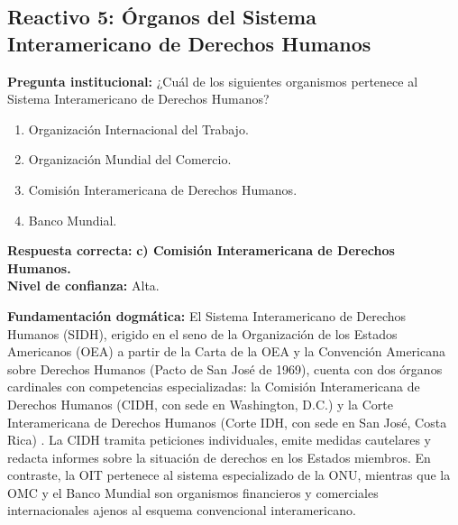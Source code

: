 \documentclass[12pt,spanish,letterpaper,oneside]{article}
\begin{document}
\subsection{Reactivo 5: \'Organos del Sistema Interamericano de Derechos Humanos}
\textbf{Pregunta institucional:} ¿Cu\'al de los siguientes organismos pertenece al Sistema Interamericano de Derechos Humanos?
\begin{enumerate}
\item[a)] Organizaci\'on Internacional del Trabajo.
\item[b)] Organizaci\'on Mundial del Comercio.
\item[c)] Comisi\'on Interamericana de Derechos Humanos.
\item[d)] Banco Mundial.
\end{enumerate}

\textbf{Respuesta correcta:} \textbf{c) Comisi\'on Interamericana de Derechos Humanos.} \\
\textbf{Nivel de confianza:} Alta.

\textbf{Fundamentaci\'on dogm\'atica:} El Sistema Interamericano de Derechos Humanos (SIDH), erigido en el seno de la Organizaci\'on de los Estados Americanos (OEA) a partir de la Carta de la OEA y la Convenci\'on Americana sobre Derechos Humanos (Pacto de San Jos\'e de 1969), cuenta con dos \'organos cardinales con competencias especializadas: la Comisi\'on Interamericana de Derechos Humanos (CIDH, con sede en Washington, D.C.) y la Corte Interamericana de Derechos Humanos (Corte IDH, con sede en San Jos\'e, Costa Rica) \citep{oeaPacto1969ADH}. La CIDH tramita peticiones individuales, emite medidas cautelares y redacta informes sobre la situaci\'on de derechos en los Estados miembros. En contraste, la OIT pertenece al sistema especializado de la ONU, mientras que la OMC y el Banco Mundial son organismos financieros y comerciales internacionales ajenos al esquema convencional interamericano.
\end{document}
